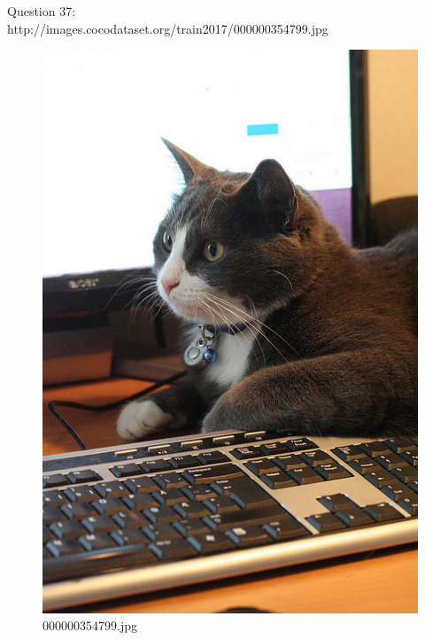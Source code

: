     Question 37:\\http://images.cocodataset.org/train2017/000000354799.jpg
    \begin{figure}[h]
        \centering
        \includegraphics[width=0.8\linewidth]{../image set/easy/000000354799.jpg}
        \caption{000000354799.jpg}
    \end{figure}
